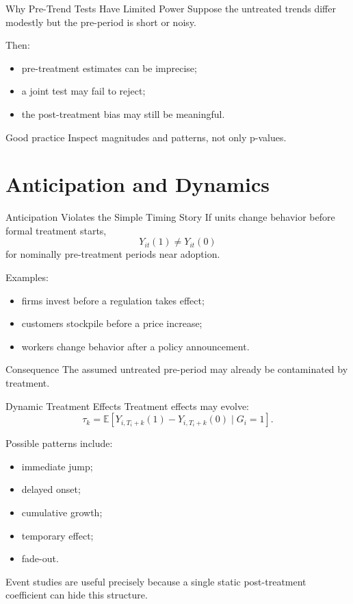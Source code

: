 \documentclass[aspectratio=169,11pt]{beamer}
\newcommand{\E}{\mathbb{E}}
\begin{document}
\begin{frame}{Why Pre-Trend Tests Have Limited Power}
Suppose the untreated trends differ modestly but the pre-period is short or noisy.

Then:
\begin{itemize}
\item pre-treatment estimates can be imprecise;
\item a joint test may fail to reject;
\item the post-treatment bias may still be meaningful.
\end{itemize}

\begin{block}{Good practice}
Inspect magnitudes and patterns, not only p-values.
\end{block}
\end{frame}

\section{Anticipation and Dynamics}

\begin{frame}{Anticipation Violates the Simple Timing Story}
If units change behavior before formal treatment starts,
\[
Y_{it}(1)\neq Y_{it}(0)
\]
for nominally pre-treatment periods near adoption.

Examples:
\begin{itemize}
\item firms invest before a regulation takes effect;
\item customers stockpile before a price increase;
\item workers change behavior after a policy announcement.
\end{itemize}

\begin{alertblock}{Consequence}
The assumed untreated pre-period may already be contaminated by treatment.
\end{alertblock}
\end{frame}

\begin{frame}{Dynamic Treatment Effects}
Treatment effects may evolve:
\[
\tau_k
=
\E[Y_{i,T_i+k}(1)-Y_{i,T_i+k}(0)\mid G_i=1].
\]

Possible patterns include:
\begin{itemize}
\item immediate jump;
\item delayed onset;
\item cumulative growth;
\item temporary effect;
\item fade-out.
\end{itemize}

Event studies are useful precisely because a single static post-treatment coefficient can hide this structure.
\end{frame}
\end{document}

